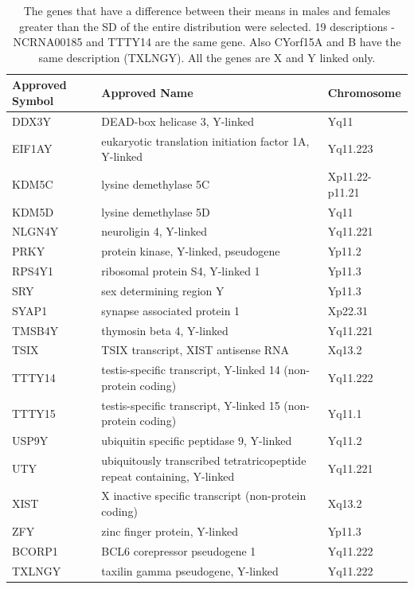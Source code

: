 \documentclass[11pt]{article} %
\begin{document}
\begin{table}[htb]
\small
   \centering
   \caption{The genes that have a difference between their means in males and females greater than the SD of the entire distribution were selected. 19 descriptions - NCRNA00185 and TTTY14 are the same gene. Also CYorf15A and B have the same description (TXLNGY). All the genes are X and Y linked only.} %
   \begin{tabular}{p{1.5cm} p{10cm} p{2.5cm}} %
   \toprule
Approved Symbol & Approved Name & Chromosome \\
\midrule
DDX3Y & DEAD-box helicase 3, Y-linked & Yq11 \\
EIF1AY & eukaryotic translation initiation factor 1A, Y-linked & Yq11.223 \\
KDM5C & lysine demethylase 5C & Xp11.22-p11.21 \\
KDM5D & lysine demethylase 5D & Yq11 \\
NLGN4Y & neuroligin 4, Y-linked & Yq11.221 \\
PRKY & protein kinase, Y-linked, pseudogene & Yp11.2 \\
RPS4Y1 & ribosomal protein S4, Y-linked 1 & Yp11.3 \\
SRY & sex determining region Y & Yp11.3 \\
SYAP1 & synapse associated protein 1 & Xp22.31 \\
TMSB4Y & thymosin beta 4, Y-linked & Yq11.221 \\
TSIX & TSIX transcript, XIST antisense RNA & Xq13.2 \\
TTTY14 & testis-specific transcript, Y-linked 14 (non-protein coding) & Yq11.222 \\
TTTY15 & testis-specific transcript, Y-linked 15 (non-protein coding) & Yq11.1 \\
USP9Y & ubiquitin specific peptidase 9, Y-linked & Yq11.2 \\
UTY & ubiquitously transcribed tetratricopeptide repeat containing, Y-linked & Yq11.221 \\
XIST & X inactive specific transcript (non-protein coding) & Xq13.2 \\
ZFY & zinc finger protein, Y-linked & Yp11.3 \\
BCORP1 & BCL6 corepressor pseudogene 1 & Yq11.222 \\
TXLNGY & taxilin gamma pseudogene, Y-linked & Yq11.222 \\
\bottomrule
   \end{tabular}
   \label{signif1}
\end{table}
\end{document}
